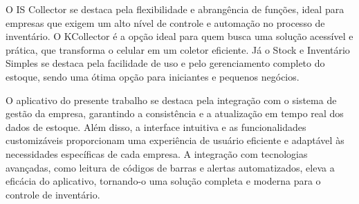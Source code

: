 O IS Collector se destaca pela flexibilidade e abrangência de funções, ideal para empresas que exigem um alto nível de controle e automação no processo de inventário. O KCollector é a opção ideal para quem busca uma solução acessível e prática, que transforma o celular em um coletor eficiente. Já o Stock e Inventário Simples se destaca pela facilidade de uso e pelo gerenciamento completo do estoque, sendo uma ótima opção para iniciantes e pequenos negócios.

O aplicativo do presente trabalho se destaca pela integração com o sistema de gestão da empresa, garantindo a consistência e a atualização em tempo real dos dados de estoque. Além disso, a interface intuitiva e as funcionalidades customizáveis proporcionam uma experiência de usuário eficiente e adaptável às necessidades específicas de cada empresa. A integração com tecnologias avançadas, como leitura de códigos de barras e alertas automatizados, eleva a eficácia do aplicativo, tornando-o uma solução completa e moderna para o controle de inventário.





